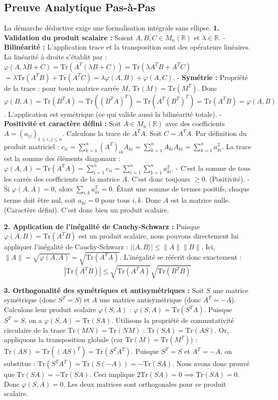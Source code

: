 \documentclass[11pt,a4paper]{report}
\begin{document}
\subsection*{Preuve Analytique Pas-à-Pas}
La démarche déductive exige une formalisation intégrale sans ellipse.
\textbf{1. Validation du produit scalaire :}
Soient $A, B, C \in M_n(\mathbb{R})$ et $\lambda \in \mathbb{R}$.
- \textbf{Bilinéarité :} L'application trace et la transposition sont des opérateurs linéaires.
  La linéarité à droite s'établit par :
  $\varphi(A, \lambda B + C) = \text{Tr}(A^T(\lambda B + C)) = \text{Tr}(\lambda A^TB + A^TC)$
  $= \lambda \text{Tr}(A^TB) + \text{Tr}(A^TC) = \lambda \varphi(A, B) + \varphi(A, C)$.
- \textbf{Symétrie :} Propriété de la trace : pour toute matrice carrée $M$, $\text{Tr}(M) = \text{Tr}(M^T)$.
  Donc $\varphi(B, A) = \text{Tr}(B^T A) = \text{Tr}((B^T A)^T) = \text{Tr}(A^T (B^T)^T) = \text{Tr}(A^T B) = \varphi(A, B)$.
  L'application est symétrique (ce qui valide aussi la bilinéarité totale).
- \textbf{Positivité et caractère défini :}
  Soit $A \in M_n(\mathbb{R})$ avec des coefficients $A = (a_{ij})_{1\le i,j \le n}$.
  Calculons la trace de $A^T A$. Soit $C = A^T A$. Par définition du produit matriciel :
  $c_{ii} = \sum_{k=1}^n (A^T)_{ik} A_{ki} = \sum_{k=1}^n A_{ki} A_{ki} = \sum_{k=1}^n a_{ki}^2$.
  La trace est la somme des éléments diagonaux :
  $\varphi(A, A) = \text{Tr}(A^T A) = \sum_{i=1}^n c_{ii} = \sum_{i=1}^n \sum_{k=1}^n a_{ki}^2$.
  - C'est la somme de tous les carrés des coefficients de la matrice $A$. C'est donc toujours $\ge 0$. (Positivité).
  - Si $\varphi(A, A) = 0$, alors $\sum_{i,k} a_{ki}^2 = 0$. Étant une somme de termes positifs, chaque terme doit être nul, soit $a_{ki} = 0$ pour tous $i, k$. Donc $A$ est la matrice nulle. (Caractère défini).
C'est donc bien un produit scalaire.

\textbf{2. Application de l'inégalité de Cauchy-Schwarz :}
Puisque $\varphi(A, B) = \text{Tr}(A^T B)$ est un produit scalaire, nous pouvons directement lui appliquer l'inégalité de Cauchy-Schwarz : $|\langle A, B \rangle| \le \|A\| \|B\|$.
Ici, $\|A\| = \sqrt{\varphi(A, A)} = \sqrt{\text{Tr}(A^T A)}$.
L'inégalité se réécrit donc exactement :
$$|\text{Tr}(A^T B)| \le \sqrt{\text{Tr}(A^T A)} \sqrt{\text{Tr}(B^T B)}$$

\textbf{3. Orthogonalité des symétriques et antisymétriques :}
Soit $S$ une matrice symétrique (donc $S^T = S$) et $A$ une matrice antisymétrique (donc $A^T = -A$).
Calculons leur produit scalaire $\varphi(S, A)$ :
$\varphi(S, A) = \text{Tr}(S^T A)$.
Puisque $S^T = S$, on a $\varphi(S, A) = \text{Tr}(SA)$.
Utilisons la propriété de commutativité circulaire de la trace $\text{Tr}(MN) = \text{Tr}(NM)$ :
$\text{Tr}(SA) = \text{Tr}(AS)$.
Or, appliquons la transposition globale (car $\text{Tr}(M) = \text{Tr}(M^T)$) :
$\text{Tr}(AS) = \text{Tr}((AS)^T) = \text{Tr}(S^T A^T)$.
Puisque $S^T = S$ et $A^T = -A$, on substitue :
$\text{Tr}(S^T A^T) = \text{Tr}(S(-A)) = -\text{Tr}(SA)$.
Nous avons donc prouvé que $\text{Tr}(SA) = -\text{Tr}(SA)$.
Ceci implique $2\text{Tr}(SA) = 0 \implies \text{Tr}(SA) = 0$.
Donc $\varphi(S, A) = 0$. Les deux matrices sont orthogonales pour ce produit scalaire.
\end{document}
